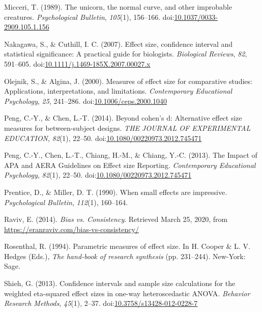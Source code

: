 \documentclass[
  man,floatsintext]{apa6}
\begin{document}
\leavevmode\hypertarget{ref-Micceri_1989}{}%
Micceri, T. (1989). The unicorn, the normal curve, and other improbable creatures. \emph{Psychological Bulletin}, \emph{105}(1), 156--166. doi:\href{https://doi.org/10.1037/0033-2909.105.1.156}{10.1037/0033-2909.105.1.156}

\leavevmode\hypertarget{ref-Nakagawa_and_Cuthill_2007}{}%
Nakagawa, S., \& Cuthill, I. C. (2007). Effect size, confidence interval and statistical significance: A practical guide for biologists. \emph{Biological Reviews}, \emph{82}, 591--605. doi:\href{https://doi.org/10.1111/j.1469-185X.2007.00027.x}{10.1111/j.1469-185X.2007.00027.x}

\leavevmode\hypertarget{ref-Olejnik_Algina_2000}{}%
Olejnik, S., \& Algina, J. (2000). Measures of effect size for comparative studies: Applications, interpretations, and limitations. \emph{Contemporary Educational Psychology}, \emph{25}, 241--286. doi:\href{https://doi.org/10.1006/ceps.2000.1040}{10.1006/ceps.2000.1040}

\leavevmode\hypertarget{ref-Peng_and_Chen_2014}{}%
Peng, C.-Y., \& Chen, L.-T. (2014). Beyond cohen's d: Alternative effect size measures for between-subject designs. \emph{THE JOURNAL OF EXPERIMENTAL EDUCATION}, \emph{82}(1), 22--50. doi:\href{https://doi.org/10.1080/00220973.2012.745471}{10.1080/00220973.2012.745471}

\leavevmode\hypertarget{ref-Peng_et_al_2013}{}%
Peng, C.-Y., Chen, L.-T., Chiang, H.-M., \& Chiang, Y.-C. (2013). The Impact of APA and AERA Guidelines on Effect size Reporting. \emph{Contemporary Educational Psychology}, \emph{82}(1), 22--50. doi:\href{https://doi.org/10.1080/00220973.2012.745471}{10.1080/00220973.2012.745471}

\leavevmode\hypertarget{ref-Prentice_Miller_1992}{}%
Prentice, D., \& Miller, D. T. (1990). When small effects are impressive. \emph{Psychological Bulletin}, \emph{112}(1), 160--164.

\leavevmode\hypertarget{ref-Raviv}{}%
Raviv, E. (2014). \emph{Bias vs. Consistency}. Retrieved March 25, 2020, from \url{https://eranraviv.com/bias-vs-consistency/}

\leavevmode\hypertarget{ref-Rosenthal_1994}{}%
Rosenthal, R. (1994). Parametric measures of effect size. In H. Cooper \& L. V. Hedges (Eds.), \emph{The hand-book of research synthesis} (pp. 231--244). New-York: Sage.

\leavevmode\hypertarget{ref-Shieh_2013}{}%
Shieh, G. (2013). Confidence intervals and sample size calculations for the weighted eta-squared effect sizes in one-way heteroscedastic ANOVA. \emph{Behavior Research Methods}, \emph{45}(1), 2--37. doi:\href{https://doi.org/10.3758/s13428-012-0228-7}{10.3758/s13428-012-0228-7}
\end{document}
